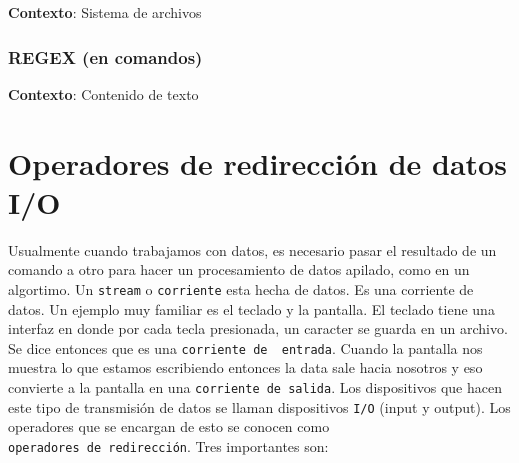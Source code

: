 \documentclass[
  spanish,
  12pt,
  letterpaper,
  DIV=11,
  numbers=noendperiod]{scrreprt}
\newenvironment{Shaded}{\begin{snugshade}}{\end{snugshade}}
\newcommand{\CommentTok}[1]{\textcolor[rgb]{0.37,0.37,0.37}{#1}}
\newcommand{\FunctionTok}[1]{\textcolor[rgb]{0.28,0.35,0.67}{#1}}
\newcommand{\NormalTok}[1]{\textcolor[rgb]{0.00,0.23,0.31}{#1}}
\newcommand{\StringTok}[1]{\textcolor[rgb]{0.13,0.47,0.30}{#1}}
\begin{document}
\textbf{Contexto}: Sistema de archivos

\subsubsection{REGEX (en comandos)}\label{regex-en-comandos}

\begin{Shaded}
\end{Shaded}

\textbf{Contexto}: Contenido de texto

\section{Operadores de redirección de datos
I/O}\label{operadores-de-redirecciuxf3n-de-datos-io}

Usualmente cuando trabajamos con datos, es necesario pasar el resultado
de un comando a otro para hacer un procesamiento de datos apilado, como
en un algortimo. Un \texttt{stream} o \texttt{corriente} esta hecha de
datos. Es una corriente de datos. Un ejemplo muy familiar es el teclado
y la pantalla. El teclado tiene una interfaz en donde por cada tecla
presionada, un caracter se guarda en un archivo. Se dice entonces que es
una \texttt{corriente\ de\ \ entrada}. Cuando la pantalla nos muestra lo
que estamos escribiendo entonces la data sale hacia nosotros y eso
convierte a la pantalla en una \texttt{corriente\ de\ salida}. Los
dispositivos que hacen este tipo de transmisión de datos se llaman
dispositivos \texttt{I/O} (input y output). Los operadores que se
encargan de esto se conocen como \texttt{operadores\ de\ redirección}.
Tres importantes son:
\end{document}
